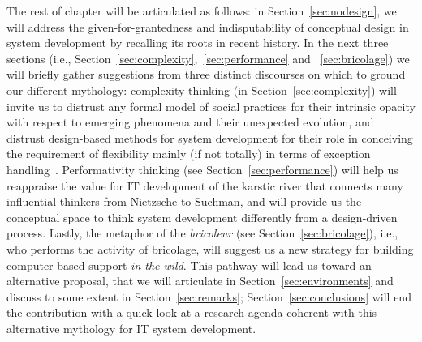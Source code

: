 \documentclass{article}
\begin{document}
The rest of chapter will be articulated as follows: in Section~\ref{sec:nodesign}, we will address the given-for-grantedness and indisputability of conceptual design in system development by recalling its roots in recent history. In the next three sections (i.e., Section~\ref{sec:complexity},~\ref{sec:performance} and ~\ref{sec:bricolage}) we will briefly gather suggestions from three distinct discourses on which to ground our different mythology: complexity thinking (in Section~\ref{sec:complexity}) will invite us to distrust any formal model of social practices for their intrinsic opacity with respect to emerging phenomena and their unexpected evolution, and distrust design-based methods for system development for their role in conceiving the requirement of flexibility mainly (if not totally) in terms of exception handling~\citep{cabitza_computational_2013}.
Performativity thinking (see Section~\ref{sec:performance}) will help us reappraise the value for IT development of the karstic river that connects many influential thinkers from Nietzsche to Suchman, and will provide us the conceptual space to think system development differently from a design-driven process. Lastly, the metaphor of the \emph{bricoleur} (see Section~\ref{sec:bricolage}), i.e., who performs the activity of bricolage, will suggest us a new strategy for building computer-based support \emph{in the wild}. This pathway will lead us toward an alternative proposal, that we will articulate in Section~\ref{sec:environments} and discuss to some extent in  Section~\ref{sec:remarks}; Section~\ref{sec:conclusions} will end the contribution with a quick look at a research agenda coherent with this alternative mythology for IT system development.
\end{document}
